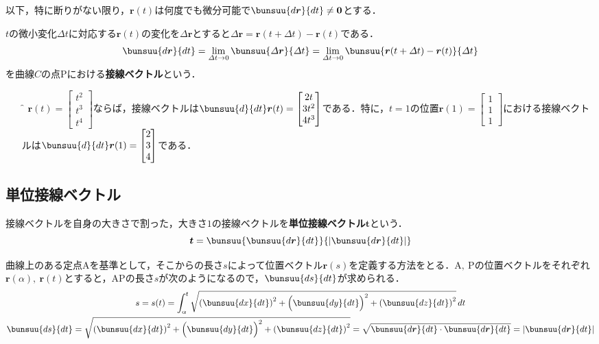 以下，特に断りがない限り，$\bm{r}(t)$は何度でも微分可能で$\bunsuu{d\bm{r}}{dt} \ne \bm{0}$とする．

$t$の微小変化$\varDelta t$に対応する$\bm{r}(t)$の変化を$\varDelta \bm{r}$とすると$\varDelta \bm{r} = \bm{r}(t + \varDelta t) - \bm{r}(t)$である．
\begin{equation}
	\bunsuu{d\bm{r}}{dt} = \lim_{\varDelta t \to 0} \bunsuu{\varDelta \bm{r}}{\varDelta t} = \lim_{\varDelta t \to 0} \bunsuu{\bm{r}(t + \varDelta t) - \bm{r}(t)}{\varDelta t}
\end{equation}
を曲線$C$の点$\mathrm{P}$における\textbf{接線ベクトル}という．

\begin{enumerate}[leftmargin=18pt, labelsep=10pt, labelsep=10pt, itemindent=9pt]
	\item[\f{例}] $\bm{r}(t) =
		\begin{bmatrix}
			t^2\\ t^3\\ t^4
		\end{bmatrix}
		$ならば，接線ベクトルは$\bunsuu{d}{dt}\bm{r}(t) =
		\begin{bmatrix}
			2t\\ 3t^2\\ 4t^3
		\end{bmatrix}
		$である．特に，$t = 1$の位置$\bm{r}(1) =
		\begin{bmatrix}
			1\\ 1\\ 1
		\end{bmatrix}
		$における接線ベクトルは$\bunsuu{d}{dt}\bm{r}(1) =
		\begin{bmatrix}
			2\\ 3\\ 4
		\end{bmatrix}
		$である．
\end{enumerate}



\subsection{単位接線ベクトル}

接線ベクトルを自身の大きさで割った，大きさ$1$の接線ベクトルを\textbf{単位接線ベクトル}$\bm{t}$という．
\begin{equation}
	\bm{t} = \bunsuu{\bunsuu{d\bm{r}}{dt}}{\left|\bunsuu{d\bm{r}}{dt}\right|} \label{equ:VK-1}
\end{equation}

曲線上のある定点$\mathrm{A}$を基準として，そこからの長さ$s$によって位置ベクトル$\bm{r}(s)$を定義する方法をとる．$\mathrm{A,\ P}$の位置ベクトルをそれぞれ$\bm{r}(\alpha),\ \bm{r}(t)$とすると，$\mathrm{AP}$の長さ$s$が次のようになるので，$\bunsuu{ds}{dt}$が求められる．
\begin{gather}
	s = s(t) = \int_{\alpha}^{t} \sqrt{\left(\bunsuu{dx}{dt}\right)^2 + \Bigl(\bunsuu{dy}{dt}\Bigr)^2 + \left(\bunsuu{dz}{dt}\right)^2}\,dt\\
	\bunsuu{ds}{dt} = \sqrt{\left(\bunsuu{dx}{dt}\right)^2 + \Bigl(\bunsuu{dy}{dt}\Bigr)^2 + \left(\bunsuu{dz}{dt}\right)^2} = \sqrt{\bunsuu{d\bm{r}}{dt} \cdot \bunsuu{d\bm{r}}{dt}} = \left|\bunsuu{d\bm{r}}{dt}\right|
\end{gather}

